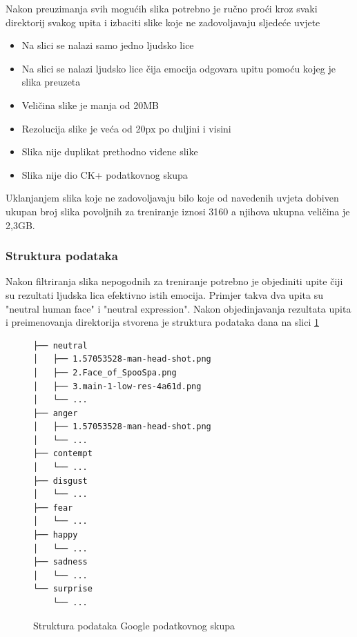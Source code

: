\documentclass[times, utf8, zavrsni,numeric,pstricks]{fer}
\begin{document}
\noindent
Nakon preuzimanja svih mogućih slika potrebno je ručno proći kroz svaki direktorij svakog upita i izbaciti slike koje ne zadovoljavaju sljedeće uvjete \label{google_npy_filter}

\begin{itemize}
	\item Na slici se nalazi samo jedno ljudsko lice
	\item Na slici se nalazi ljudsko lice čija emocija odgovara upitu pomoću kojeg je slika preuzeta
	\item Veličina slike je manja od 20MB
	\item Rezolucija slike je veća od 20px po duljini i visini
	\item Slika nije duplikat prethodno viđene slike
	\item Slika nije dio CK+ podatkovnog skupa
\end{itemize}
Uklanjanjem slika koje ne zadovoljavaju bilo koje od navedenih uvjeta dobiven ukupan broj slika povoljnih za treniranje iznosi 3160 a njihova ukupna veličina je 2,3GB.

\subsubsection{Struktura podataka}
Nakon filtriranja slika nepogodnih za treniranje potrebno je objediniti upite čiji su rezultati ljudska lica efektivno istih emocija. Primjer takva dva upita su "neutral human face" i "neutral expression". Nakon objedinjavanja rezultata upita i preimenovanja direktorija stvorena je struktura podataka dana na slici \ref{cb:google_file_structure}


\begin{figure}[H]
\centering
\begin{Verbatim}[fontsize=\small]
├── neutral
│   ├── 1.57053528-man-head-shot.png
│   ├── 2.Face_of_SpooSpa.png
│   ├── 3.main-1-low-res-4a61d.png
│   └── ...
├── anger
│   ├── 1.57053528-man-head-shot.png
│   └── ...
├── contempt
│   └── ...
├── disgust
│   └── ...
├── fear
│   └── ...
├── happy
│   └── ...
├── sadness
│   └── ...
└── surprise
    └── ...
\end{Verbatim}
\caption{Struktura podataka Google podatkovnog skupa}
\label{cb:google_file_structure}
\end{figure}
\end{document}
